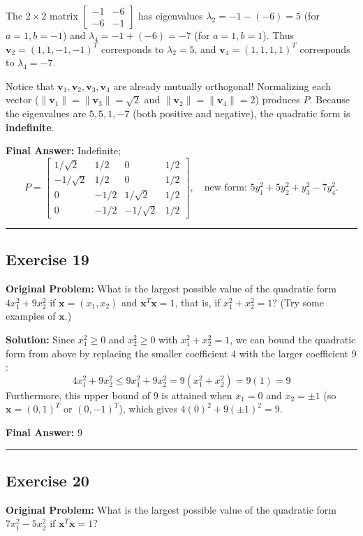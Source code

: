 \documentclass[11pt, letterpaper]{article}
\theoremstyle{definition}
\theoremstyle{remark}
\begin{document}
\begin{itemize}
\[    \]
    The $2 \times 2$ matrix $\begin{bmatrix} -1 & -6 \\ -6 & -1 \end{bmatrix}$ has eigenvalues $\lambda_2 = -1 - (-6) = 5$ (for $a = 1, b = -1$) and $\lambda_4 = -1 + (-6) = -7$ (for $a = 1, b = 1$).
    Thus $\mathbf{v}_2 = (1, 1, -1, -1)^T$ corresponds to $\lambda_2 = 5$, and $\mathbf{v}_4 = (1, 1, 1, 1)^T$ corresponds to $\lambda_4 = -7$.
\end{itemize}
Notice that $\mathbf{v}_1, \mathbf{v}_2, \mathbf{v}_3, \mathbf{v}_4$ are already mutually orthogonal! Normalizing each vector ($\|\mathbf{v}_1\| = \|\mathbf{v}_3\| = \sqrt{2}$ and $\|\mathbf{v}_2\| = \|\mathbf{v}_4\| = 2$) produces $P$. Because the eigenvalues are $5, 5, 1, -7$ (both positive and negative), the quadratic form is \textbf{indefinite}.

\textbf{Final Answer:} Indefinite;
\[
P = \begin{bmatrix} 1/\sqrt{2} & 1/2 & 0 & 1/2 \\ -1/\sqrt{2} & 1/2 & 0 & 1/2 \\ 0 & -1/2 & 1/\sqrt{2} & 1/2 \\ 0 & -1/2 & -1/\sqrt{2} & 1/2 \end{bmatrix}, \quad \text{new form: } 5y_1^2 + 5y_2^2 + y_3^2 - 7y_4^2.
\]

\medskip\hrule\medskip

\subsection*{Exercise 19}
\textbf{Original Problem:} What is the largest possible value of the quadratic form $4x_1^2 + 9x_2^2$ if $\mathbf{x} = (x_1, x_2)$ and $\mathbf{x}^T \mathbf{x} = 1$, that is, if $x_1^2 + x_2^2 = 1$? (Try some examples of $\mathbf{x}$.)

\textbf{Solution:}
Since $x_1^2 \ge 0$ and $x_2^2 \ge 0$ with $x_1^2 + x_2^2 = 1$, we can bound the quadratic form from above by replacing the smaller coefficient $4$ with the larger coefficient $9$:
\[
4x_1^2 + 9x_2^2 \le 9x_1^2 + 9x_2^2 = 9(x_1^2 + x_2^2) = 9(1) = 9
\]
Furthermore, this upper bound of $9$ is attained when $x_1 = 0$ and $x_2 = \pm 1$ (so $\mathbf{x} = (0, 1)^T$ or $(0, -1)^T$), which gives $4(0)^2 + 9(\pm 1)^2 = 9$.

\textbf{Final Answer:} $9$

\medskip\hrule\medskip

\subsection*{Exercise 20}
\textbf{Original Problem:} What is the largest possible value of the quadratic form $7x_1^2 - 5x_2^2$ if $\mathbf{x}^T \mathbf{x} = 1$?
\end{document}
